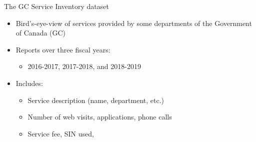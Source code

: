 \documentclass[compress]{beamer}
\begin{document}
\begin{frame}
The GC Service Inventory dataset
\vfill
\begin{itemize}
	\item Bird’s-eye-view of services provided by some departments of the Government of Canada (GC)

\vfill
	\item Reports over three fiscal years:
	\begin{itemize}
	    \item 2016-2017, 2017-2018, and 2018-2019
	\end{itemize}
\vfill	

	\item Includes:
	\begin{itemize}
        \item Service description (name, department, etc.)
        \item Number of web visits, applications, phone calls
        \item Service fee, SIN used, 
    \end{itemize}
\vfill	
\end{itemize}

\end{frame}
\end{document}
